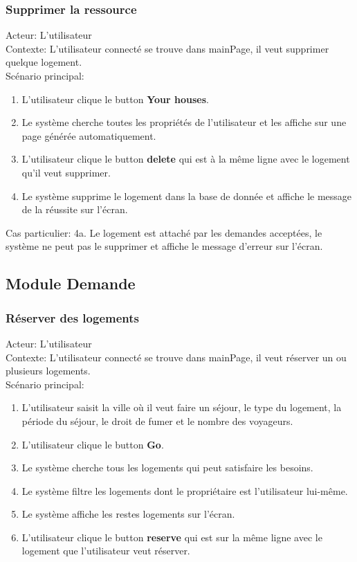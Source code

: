 \documentclass[14px]{article}
\begin{document}
\subsubsection{Supprimer la ressource}
Acteur: L'utilisateur\\
Contexte: L'utilisateur connecté se trouve dans mainPage, il veut supprimer quelque logement.\\
Scénario principal:
\begin{enumerate}
	\item L'utilisateur clique le button \textbf{Your houses}.
	\item Le système cherche toutes les propriétés de l'utilisateur et les affiche sur une page générée automatiquement.
	\item L'utilisateur clique le button \textbf{delete} qui est à la même ligne avec le logement qu'il veut supprimer.
	\item Le système supprime le logement dans la base de donnée et affiche le message de la réussite sur l'écran. 
\end{enumerate}
Cas particulier:
4a. Le logement est attaché par les demandes acceptées, le système ne peut pas le supprimer et affiche le message d'erreur sur l'écran.

\subsection{Module Demande}
\subsubsection{Réserver des logements}
Acteur: L'utilisateur\\
Contexte: L'utilisateur connecté se trouve dans mainPage, il veut réserver un ou plusieurs logements.\\
Scénario principal:
\begin{enumerate}
	\item L'utilisateur saisit la ville où il veut faire un séjour, le type du logement, la période du séjour, le droit de fumer et le nombre des voyageurs.
	\item L'utilisateur clique le button \textbf{Go}.
	\item Le système cherche tous les logements qui peut satisfaire les besoins.
	\item Le système filtre les logements dont le propriétaire est l'utilisateur lui-même.
	\item Le système affiche les restes logements sur l'écran.
	\item L'utilisateur clique le button \textbf{reserve} qui est sur la même ligne avec le logement que l'utilisateur veut réserver.	
\end{enumerate}
\end{document}
